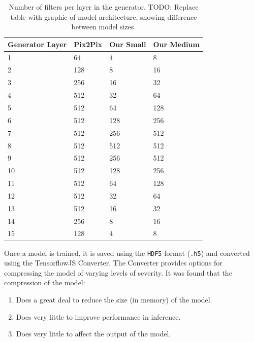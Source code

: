 \documentclass{article}
\begin{document}
\begin{small}
	\begin{table}
		\begin{center}
			\begin{tabular}{p{2cm}p{2cm}p{2cm}p{2cm}}
				\toprule
				Generator Layer & Pix2Pix & Our Small & Our Medium \\
				\midrule
				1               & 64      & 4         & 8          \\
				2               & 128     & 8         & 16         \\
				3               & 256     & 16        & 32         \\
				4               & 512     & 32        & 64         \\
				5               & 512     & 64        & 128        \\
				6               & 512     & 128       & 256        \\
				7               & 512     & 256       & 512        \\
				8               & 512     & 512       & 512        \\
				9               & 512     & 256       & 512        \\
				10              & 512     & 128       & 256        \\
				11              & 512     & 64        & 128        \\
				12              & 512     & 32        & 64         \\
				13              & 512     & 16        & 32         \\
				14              & 256     & 8         & 16         \\
				15              & 128     & 4         & 8          \\
				\bottomrule
			\end{tabular}
			\caption{Number of filters per layer in the generator. TODO: Replace table with graphic of model architecture, showing difference between model sizes.}
		\end{center}
	\end{table}
\end{small}

Once a model is trained, it is saved using the \verb|HDF5| format (\verb|.h5|) and converted using the TensorflowJS Converter. The Converter provides options for compressing the model of varying levels of severity. It was found that the compression of the model:

\begin{enumerate}
	\item Does a great deal to reduce the size (in memory) of the model.
	\item Does very little to improve performance in inference.
	\item Does very little to affect the output of the model.
\end{enumerate}
\end{document}

